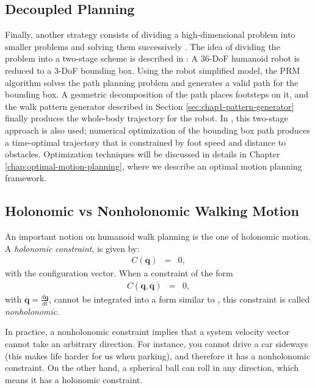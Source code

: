 \subsection{Decoupled Planning}
\label{subsec:chap1-bounding-box}

Finally, another strategy consists of dividing a high-dimensional
problem into smaller problems and solving them successively
\cite{zhan09}. The idea of dividing the problem into a two-stage
scheme is described in \cite{yosh08}: A 36-DoF humanoid robot is
reduced to a 3-DoF bounding box. Using the robot simplified model, the
PRM algorithm solves the path planning problem and generates a valid
path for the bounding box. A geometric decomposition of the path
places footsteps on it, and the walk pattern generator described in
Section \ref{sec:chap1-pattern-generator} finally produces the
whole-body trajectory for the robot. In \cite{moul10}, this two-stage
approach is also used; numerical optimization of the bounding box path
produces a time-optimal trajectory that is constrained by foot speed
and distance to obstacles. Optimization techniques will be discussed
in details in Chapter \ref{chap:optimal-motion-planning}, where we
describe an optimal motion planning framework.

\subsection{Holonomic vs Nonholonomic Walking Motion}
\label{subsec:chap1-holonomic}

An important notion on humanoid walk planning is the one of holonomic
motion.
A \emph{holonomic} \emph{constraint}, is given by:
\begin{eqnarray} C(\mathbf{q}) & = & 0,
  \label{eq:chap1-holonomic_constraint}
\end{eqnarray}
with \config{} the configuration vector. When a constraint of the form
\begin{eqnarray}
  C(\mathbf{q,}\overset{.}{\mathbf{q}}) & = & 0,
\end{eqnarray}
with $\mathbf{\overset{.}{\mathbf{q}}=}\frac{d\mathbf{q}}{dt}$, cannot
be integrated into a form similar to ,
this constraint is called \emph{nonholonomic}.

In practice, a nonholonomic constraint implies that a system velocity
vector cannot take an arbitrary direction. For instance, you cannot
drive a car sideways (this makes life harder for us when parking), and
therefore it has a nonholonomic constraint. On the other hand, a
spherical ball can roll in any direction, which means it has a
holonomic constraint.

